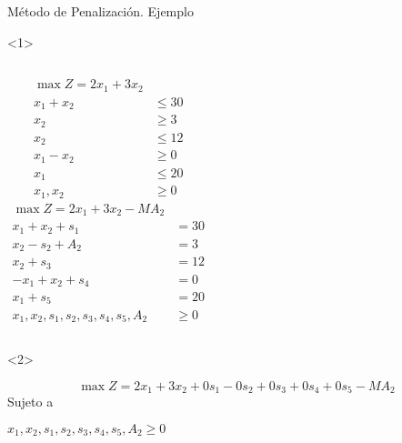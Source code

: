 \begin{frame}{Método de Penalización. Ejemplo}{}

  \begin{onlyenv}<1>
      \begin{columns}
  \begin{align*}
    \max Z = 2x_1 + 3x_2 & \\[5mm]
    x_1 + x_2 & \leq 30\\
    x_2 & \geq 3\\
    x_2 & \leq 12\\
    x_1 - x_2 & \geq 0\\
    x_1  & \leq 20 \\[5mm]
    x_1, x_2 & \geq 0
  \end{align*}
  \begin{align*}
   \max Z = 2x_1 + 3x_2 - MA_2& \\[5mm]
    x_1 + x_2 + s_1  & = 30\\
    x_2  - s_2  + A_2 &= 3\\
    x_2  + s_3 &= 12\\
    -x_1 + x_2 + s_4 & =  0\\
    x_1  + s_5& = 20 \\[5mm]
    x_1, x_2, s_1, s_2, s_3, s_4, s_5, A_2 & \geq 0
  \end{align*}
  \end{columns}
\end{onlyenv}

\begin{onlyenv}<2>

  \[ \max Z = 2x_1 + 3x_2 +0s_1 - 0s_2 + 0s_3 + 0s_4 + 0s_5 - MA_2 \]
  Sujeto a 

$x_1, x_2, s_1, s_2, s_3, s_4, s_5, A_2  \geq 0$
\end{onlyenv}
\end{frame}

